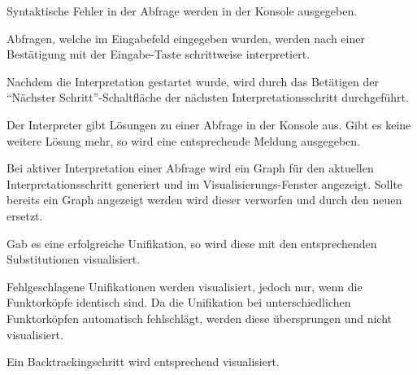 \documentclass[parskip=full,11pt,twoside]{scrartcl}
\begin{document}

Syntaktische Fehler in der Abfrage werden in der Konsole ausgegeben.


Abfragen, welche im Eingabefeld eingegeben wurden, werden nach einer Bestätigung mit der Eingabe-Taste schrittweise interpretiert.


Nachdem die Interpretation gestartet wurde, wird durch das Betätigen der \enquote{Nächster Schritt}-Schaltfläche der nächsten Interpretationsschritt durchgeführt.


Der Interpreter gibt Lösungen zu einer Abfrage in der Konsole aus. Gibt es keine weitere Lösung mehr, so wird eine entsprechende Meldung ausgegeben.


Bei aktiver Interpretation einer Abfrage wird ein Graph für den aktuellen Interpretationsschritt generiert und im Visualisierungs-Fenster angezeigt. Sollte bereits ein Graph angezeigt werden wird dieser verworfen und durch den neuen ersetzt.


Gab es eine erfolgreiche Unifikation, so wird diese mit den entsprechenden Substitutionen visualisiert.


Fehlgeschlagene Unifikationen werden visualisiert, jedoch nur, wenn die Funktorköpfe identisch sind. Da die Unifikation bei unterschiedlichen Funktorköpfen automatisch fehlschlägt, werden diese übersprungen und nicht visualisiert.


Ein Backtrackingschritt wird entsprechend visualisiert.
\end{document}
